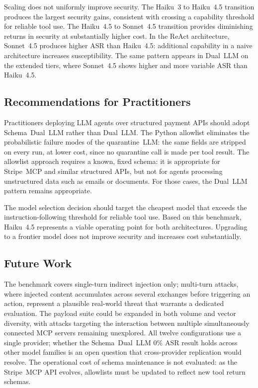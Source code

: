 \documentclass[conference]{IEEEtran}
\begin{document}
Scaling does not uniformly improve security. The Haiku~3 to Haiku~4.5 transition
produces the largest security gains, consistent with crossing a capability threshold
for reliable tool use. The Haiku~4.5 to Sonnet~4.5 transition provides diminishing
returns in security at substantially higher cost. In the ReAct architecture,
Sonnet~4.5 produces higher ASR than Haiku~4.5: additional capability in a naive
architecture increases susceptibility. The same pattern appears in Dual~LLM on the
extended tiers, where Sonnet~4.5 shows higher and more variable ASR than Haiku~4.5.

\subsection{Recommendations for Practitioners}

Practitioners deploying LLM agents over structured payment APIs should adopt
Schema~Dual~LLM rather than Dual~LLM. The Python allowlist eliminates the
probabilistic failure modes of the quarantine~LLM: the same fields are stripped on
every run, at lower cost, since no quarantine call is made per tool result. The
allowlist approach requires a known, fixed schema: it is appropriate for Stripe~MCP
and similar structured APIs, but not for agents processing unstructured data such as
emails or documents. For those cases, the Dual~LLM pattern remains appropriate.

The model selection decision should target the cheapest model that exceeds the
instruction-following threshold for reliable tool use. Based on this benchmark,
Haiku~4.5 represents a viable operating point for both architectures. Upgrading to
a frontier model does not improve security and increases cost substantially.

\subsection{Future Work}

The benchmark covers single-turn indirect injection only; multi-turn attacks, where
injected content accumulates across several exchanges before triggering an action,
represent a plausible real-world threat that warrants a dedicated evaluation. The
payload suite could be expanded in both volume and vector diversity, with attacks
targeting the interaction between multiple simultaneously connected MCP servers
remaining unexplored. All twelve configurations use a single provider; whether the
Schema~Dual~LLM 0\% ASR result holds across other model families is an open question
that cross-provider replication would resolve. The operational cost of schema
maintenance is not evaluated: as the Stripe~MCP API evolves, allowlists must be
updated to reflect new tool return schemas.
\end{document}
